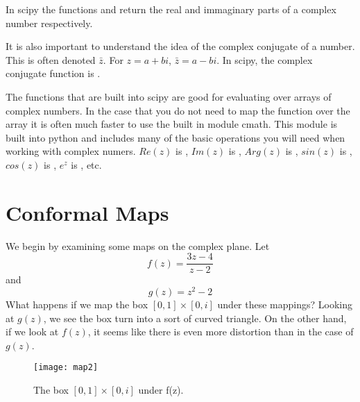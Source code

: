In scipy the functions  and  return the real and immaginary parts of a complex number respectively.

It is also important to understand the idea of the complex conjugate of a number. This is often denoted $\bar{z}$. For $z=a+bi$, $\bar{z}=a-bi$. In scipy, the complex conjugate function is .

The functions that are built into scipy are good for evaluating over arrays of complex numbers. In the case that you do not need to map the function over the array it is often much faster to use the built in module cmath. This module is built into python and includes many of the basic operations you will need when working with complex numers. $Re(z)$ is , $Im(z)$ is , $Arg(z)$ is , $sin(z)$ is , $cos(z)$ is , $e^z$ is , etc.

\begin{comment} 
\begin{problem}# This problem is super basic, probably don't need to waste time on this
Write a function which accepts a complex number $z$ and returns the ordered pair $(r,\theta)$ corresponding to the polar representation of $z$. Include a special case for $z=0$. Use the built in real part and imaginary part members (i.e. \li{z.real} and \li{z.imag}), not the modulus and argument functions. You may use the functions \li{sp.arctan} and \li{sp.hypot}.
\end{problem}
\end{comment}

\section*{Conformal Maps}

We begin by examining some maps on the complex plane.  Let
\[
f(z) = \frac{3z - 4}{z - 2}
\]
and
\[
g(z) = z^2 - 2
\]
What happens if we map the box $[0,1]\times[0,i]$ under these mappings?
\newpage
Looking at $g(z)$, we see the box turn into a sort of curved triangle.  On the other hand, if we look at $f(z)$, it seems like there is even more distortion than in the case of $g(z)$.

\begin{figure}
\begin{center}
\texttt{[image: map2]}
\caption{The box $[0,1]\times[0,i]$ under f(z).}
\end{center}
\end{figure}

